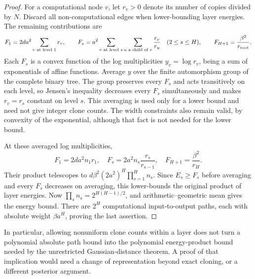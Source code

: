 \begin{proof}
For a computational node $v$, let $r_v>0$ denote its number of copies
divided by $N$. Discard all non-computational edges when lower-bounding
layer energies. The remaining contributions are
\[
 F_1=2da^2\sum_{v\text{ at level }1}r_v,
 \qquad
 F_s=a^2\sum_{v\text{ at level }s}
       \sum_{u\text{ a child of }v}\frac{r_v}{r_u}
       \quad(2\le s\le H),
 \qquad
 F_{H+1}=\frac{\beta^2}{r_{\rm root}}.
\]
Each $F_s$ is a convex function of the log multiplicities
$y_v=\log r_v$, being a sum of exponentials of affine functions.
Average $y$ over the finite automorphism group of the complete binary
tree. The group preserves every $F_s$ and acts transitively on each level,
so Jensen's inequality decreases every $F_s$ simultaneously and makes
$r_v=r_s$ constant on level $s$. This averaging is used only for a lower
bound and need not give integer clone counts. The width constraints also
remain valid, by convexity of the exponential, although that fact is not
needed for the lower bound.

At these averaged log multiplicities,
\[
 F_1=2da^2 n_1r_1,\quad
 F_s=2a^2 n_s\frac{r_s}{r_{s-1}},\quad
 F_{H+1}=\frac{\beta^2}{r_H}.
\]
Their product telescopes to
$d\beta^2(2a^2)^H\prod_{s=1}^H n_s$.
Since $E_s\ge F_s$ before averaging and every $F_s$ decreases on
averaging, this lower-bounds the original product of layer energies.
Now $\prod_s n_s=2^{H(H-1)/2}$, and arithmetic--geometric mean gives the
energy bound. There are $2^H$ computational input-to-output paths, each
with absolute weight $\beta a^H$, proving the last assertion.
\end{proof}

In particular, allowing nonuniform clone counts within a layer does not
turn a polynomial absolute path bound into the polynomial energy-product
bound needed by the unrestricted Gaussian-distance theorem. A proof of
that implication would need a change of representation beyond exact
cloning, or a different posterior argument.
